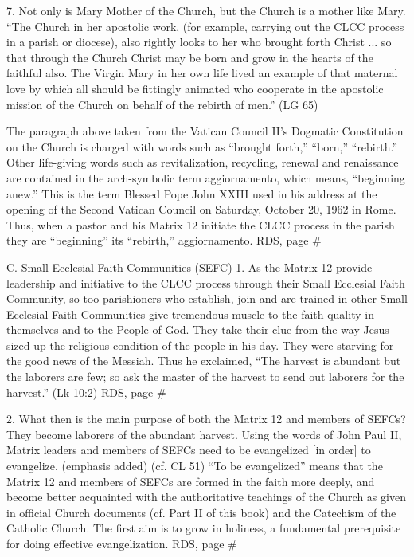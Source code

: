 \documentclass[oneside]{book}
\begin{document}
7. Not only is Mary Mother of the Church, but the Church is a mother like
Mary. ``The Church in her apostolic work, (for example, carrying out the CLCC
process in a parish or diocese), also rightly looks to her who brought forth
Christ ... so that through the Church Christ may be born and grow in the hearts
of the faithful also. The Virgin Mary in her own life lived an example of that
maternal love by which all should be fittingly animated who cooperate in the
apostolic mission of the Church on behalf of the rebirth of men.'' (LG 65)

The paragraph above taken from the Vatican Council II's Dogmatic Constitution on
the Church is charged with words such as ``brought forth,'' ``born,''
``rebirth.'' Other life-giving words such as revitalization, recycling, renewal
and renaissance are contained in the arch-symbolic term aggiornamento, which
means, ``beginning anew.'' This is the term Blessed Pope John XXIII used in his
address at the opening of the Second Vatican Council on Saturday, October 20,
1962 in Rome. Thus, when a pastor and his Matrix 12 initiate the CLCC process in
the parish they are ``beginning'' its ``rebirth,'' aggiornamento.
RDS, page \#

C. Small Ecclesial Faith Communities (SEFC)
1. As the Matrix 12 provide leadership and initiative to the CLCC process
through their Small Ecclesial Faith Community, so too parishioners who
establish, join and are trained in other Small Ecclesial Faith Communities give
tremendous muscle to the faith-quality in themselves and to the People of
God. They take their clue from the way Jesus sized up the religious condition of
the people in his day. They were starving for the good news of the Messiah. Thus
he exclaimed, ``The harvest is abundant but the laborers are few; so ask the
master of the harvest to send out laborers for the harvest.'' (Lk 10:2)
RDS, page \#

2. What then is the main purpose of both the Matrix 12 and members of SEFCs?
They become laborers of the abundant harvest. Using the words of John Paul II,
Matrix leaders and members of SEFCs need to be evangelized [in order] to
evangelize. (emphasis added) (cf. CL 51)
``To be evangelized'' means that the Matrix 12 and members of SEFCs are formed
in the faith more deeply, and become better acquainted with the authoritative
teachings of the Church as given in official Church documents (cf. Part II of
this book) and the Catechism of the Catholic Church. The first aim is to grow in
holiness, a fundamental prerequisite for doing effective evangelization.
RDS, page \#
\end{document}
